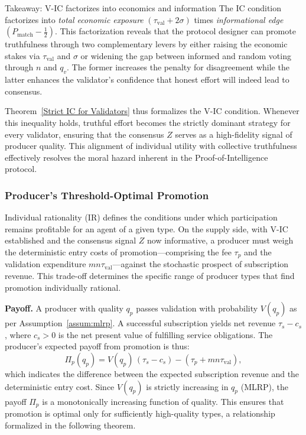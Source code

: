 \begin{interpretbox}{Takeaway: V-IC factorizes into economics and information}
The IC condition factorizes into \textit{total economic exposure} $(\tau_{\text{val}}+2\sigma)$ times \textit{informational edge} $(P_{\text{match}}-\tfrac{1}{2})$. This factorization reveals that the protocol designer can promote truthfulness through two complementary levers by either raising the economic stakes via $\tau_{\text{val}}$ and $\sigma$ or widening the gap between informed and random voting through $n$ and $q_v$. The former increases the penalty for disagreement while the latter enhances the validator's confidence that honest effort will indeed lead to consensus.
\end{interpretbox}

\noindent Theorem~\ref{Strict IC for Validators} thus formalizes the V-IC condition. Whenever this inequality holds, truthful effort becomes the strictly dominant strategy for every validator, ensuring that the consensus $Z$ serves as a high-fidelity signal of producer quality. This alignment of individual utility with collective truthfulness effectively resolves the moral hazard inherent in the Proof-of-Intelligence protocol.

\subsubsection{Producer's Threshold-Optimal Promotion}
\label{sec:producer_ir}

Individual rationality (IR) defines the conditions under which participation remains profitable for an agent of a given type. On the supply side, with V-IC established and the consensus signal $Z$ now informative, a producer must weigh the deterministic entry costs of promotion—comprising the fee $\tau_p$ and the validation expenditure $mn\tau_{\text{val}}$—against the stochastic prospect of subscription revenue. This trade-off determines the specific range of producer types that find promotion individually rational.

\textbf{Payoff.} A producer with quality $q_p$ passes validation with probability $V(q_p)$ as per Assumption~\ref{assum:mlrp}. A successful subscription yields net revenue $\tau_s - c_s$, where $c_s > 0$ is the net present value of fulfilling service obligations. The producer's expected payoff from promotion is thus:
\begin{equation}
\label{eq:producer_payoff}
\Pi_p(q_p) = V(q_p)\,(\tau_s - c_s) - (\tau_p + mn\tau_{\text{val}}),
\end{equation}
which indicates the difference between the expected subscription revenue and the deterministic entry cost. Since $V(q_p)$ is strictly increasing in $q_p$ (MLRP), the payoff $\Pi_p$ is a monotonically increasing function of quality. This ensures that promotion is optimal only for sufficiently high-quality types, a relationship formalized in the following theorem.

